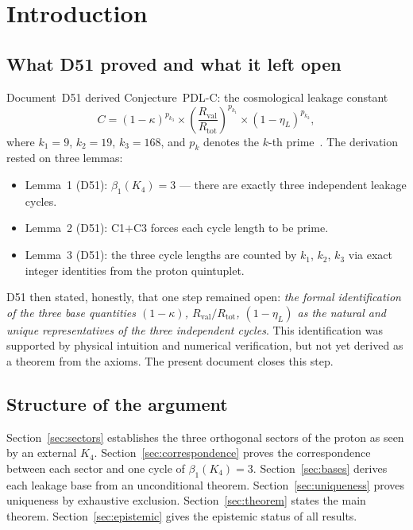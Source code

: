 \documentclass[12pt,a4paper]{article}
\newcommand{\Kfour}{K_4}
\newcommand{\Rtot}{R_{\mathrm{tot}}}
\newcommand{\Rval}{R_{\mathrm{val}}}
\newcommand{\kap}{\kappa}
\newcommand{\etaL}{\eta_L}
\newcommand{\pk}[1]{p_{#1}}
\begin{document}
\clearpage

\tableofcontents
\newpage

\section{Introduction}
\label{sec:intro}

\subsection{What D51 proved and what it left open}

Document~D51 derived Conjecture~PDL-C: the cosmological leakage constant
\begin{equation}
C = (1-\kap)^{\pk{k_3}} \times \left(\frac{\Rval}{\Rtot}\right)^{\pk{k_1}} \times (1-\etaL)^{\pk{k_2}},
\label{eq:PDL_C}
\end{equation}
where $k_1 = 9$, $k_2 = 19$, $k_3 = 168$, and $\pk{k}$ denotes the $k$-th prime~\cite{PDL_D51_2026}. The derivation rested on three lemmas:
\begin{itemize}[leftmargin=2em]
\item Lemma~1 (D51): $\beta_1(\Kfour) = 3$ — there are exactly three independent leakage cycles.
\item Lemma~2 (D51): C1$+$C3 forces each cycle length to be prime.
\item Lemma~3 (D51): the three cycle lengths are counted by $k_1$, $k_2$, $k_3$ via exact integer identities from the proton quintuplet.
\end{itemize}

D51 then stated, honestly, that one step remained open: \emph{the formal identification of the three base quantities $(1-\kap)$, $\Rval/\Rtot$, $(1-\etaL)$ as the natural and unique representatives of the three independent cycles}. This identification was supported by physical intuition and numerical verification, but not yet derived as a theorem from the axioms. The present document closes this step.

\subsection{Structure of the argument}

Section~\ref{sec:sectors} establishes the three orthogonal sectors of the proton as seen by an external $\Kfour$. Section~\ref{sec:correspondence} proves the correspondence between each sector and one cycle of $\beta_1(\Kfour) = 3$. Section~\ref{sec:bases} derives each leakage base from an unconditional theorem. Section~\ref{sec:uniqueness} proves uniqueness by exhaustive exclusion. Section~\ref{sec:theorem} states the main theorem. Section~\ref{sec:epistemic} gives the epistemic status of all results.
\end{document}
